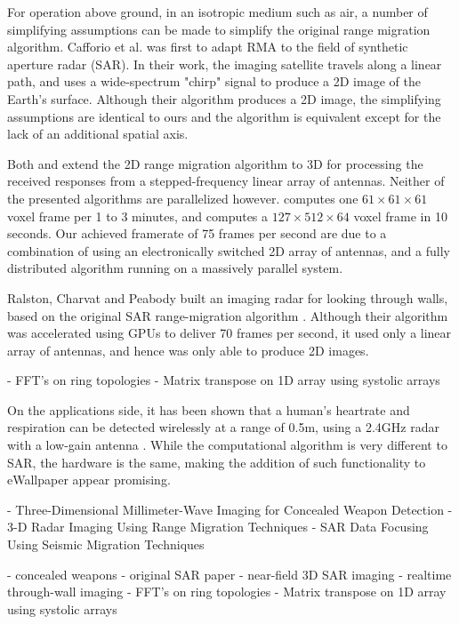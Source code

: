 \documentclass[twocolumn]{article}
\begin{document}
For operation above ground, in an isotropic medium such as air, a number of simplifying assumptions can be made to simplify the original range migration algorithm. Cafforio et al. \cite{sar-data-focussing} was first to adapt RMA to the field of synthetic aperture radar (SAR). In their work, the imaging satellite travels along a linear path, and uses a wide-spectrum "chirp" signal to produce a 2D image of the Earth's surface. Although their algorithm produces a 2D image, the simplifying assumptions are identical to ours and the algorithm is equivalent except for the lack of an additional spatial axis.

Both \cite{lopez20003} and \cite{3d-imaging-concealed-weapon} extend the 2D range migration algorithm to 3D for processing the received responses from a stepped-frequency linear array of antennas. Neither of the presented algorithms are parallelized however. \cite{lopez20003} computes one $61\times61\times61$ voxel frame per 1 to 3 minutes, and \cite{3d-imaging-concealed-weapon} computes a $127\times512\times64$ voxel frame in 10 seconds. Our achieved framerate of 75 frames per second are due to a combination of using an electronically switched 2D array of antennas, and a fully distributed algorithm running on a massively parallel system.

Ralston, Charvat and Peabody \cite{thru-wall-mimo} built an imaging radar for looking through walls, based on the original SAR range-migration algorithm \cite{sar-data-focussing}. Although their algorithm was accelerated using GPUs to deliver 70 frames per second, it used only a linear array of antennas, and hence was only able to produce 2D images.

- FFT's on ring topologies
- Matrix transpose on 1D array using systolic arrays \cite{systolic-arrays-transpose}

On the applications side, it has been shown that a human's heartrate and respiration can be detected wirelessly at a range of 0.5m, using a 2.4GHz radar with a low-gain antenna \cite{bioradar}. While the computational algorithm is very different to SAR, the hardware is the same, making the addition of such functionality to eWallpaper appear promising.

- Three-Dimensional Millimeter-Wave Imaging for Concealed Weapon Detection
- 3-D Radar Imaging Using Range Migration Techniques
- SAR Data Focusing Using Seismic Migration Techniques

- concealed weapons
- original SAR paper
- near-field 3D SAR imaging
- realtime through-wall imaging
- FFT's on ring topologies
- Matrix transpose on 1D array using systolic arrays \cite{systolic-arrays-transpose}
\end{document}
